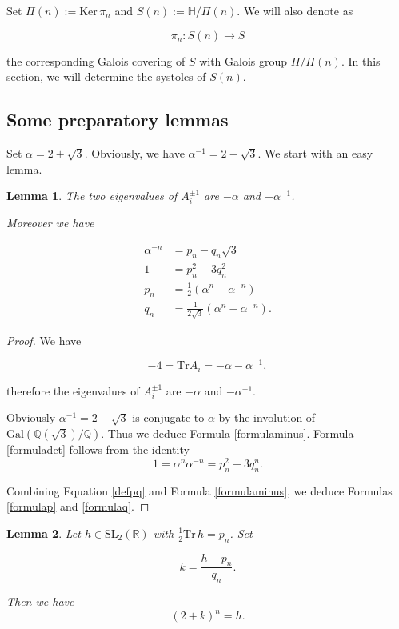 \documentclass[10pt,a4paper]{amsart}
\newcommand{\HP}{\mathbb{H}}
\newcommand{\Q}{\mathbb{Q}}
\newcommand{\R}{\mathbb{R}}
\newcommand{\Gal}{{\mathrm {Gal}}}
\newcommand{\Ker}{\mathrm{Ker}}
\newcommand{\SL}{{\mathrm {SL}}}
\newcommand{\Tr}{{\mathrm {Tr}}}
\newtheorem{lemma}{Lemma}
\begin{document}
\noindent Set $\Pi(n):=\Ker\,\pi_n$ and
$S(n):=\HP/\Pi(n).$ We will also denote as

$$\pi_n:S(n)\to S$$

\noindent the corresponding Galois covering of $S$ with Galois group $\Pi/\Pi(n)$. In this section,
we will determine the systoles of $S(n)$.

\subsection{Some preparatory lemmas}

Set $\alpha=2+\sqrt{3}$. Obviously, we have
$\alpha^{-1}=2-\sqrt{3}$.
We start with an easy lemma.


\begin{lemma}\label{formulas} The two eigenvalues of
$A_i^{\pm 1}$ are $-\alpha$ and $-\alpha^{-1}$.

Moreover we have

\begin{align}
\alpha^{-n}&=p_n-q_n\sqrt{3}\label{formulaminus}\\
1&=p_n^2-3q_n^2 \label{formuladet}\\
p_n&= \frac{1}{2}(\alpha^{n}+\alpha^{-n}) \label{formulap}\\
q_n&= \frac{1}{2\sqrt{3}}(\alpha^{n}-\alpha^{-n}).  \label{formulaq}
\end{align}
\end{lemma}


\begin{proof} We have

$$-4=\Tr A_i=-\alpha-\alpha^{-1},$$ 

\noindent therefore 
the eigenvalues of
$A_i^{\pm 1}$ are $-\alpha$ and $-\alpha^{-1}$.


Obviously
$\alpha^{-1}=2-\sqrt{3}$ is conjugate to $\alpha$ by the involution
of $\Gal(\Q(\sqrt{3})/\Q)$. Thus we deduce  
Formula \ref{formulaminus}. Formula
\ref{formuladet} follows from the identity
$$1=\alpha^n\alpha^{-n}=p_n^2-3q_n^n.$$

Combining Equation \ref{defpq} and Formula \ref{formulaminus}, we deduce 
Formulas \ref{formulap} and \ref{formulaq}.
\end{proof}


\begin{lemma}\label{nthroot} Let $h\in\SL_2(\R)$ with
$\frac{1}{2}\Tr\,h=p_n$. Set

$$k=\frac{h-p_n}{q_n}.$$

Then we have 
$$(2+k)^n=h.$$
\end{lemma}
\end{document}

